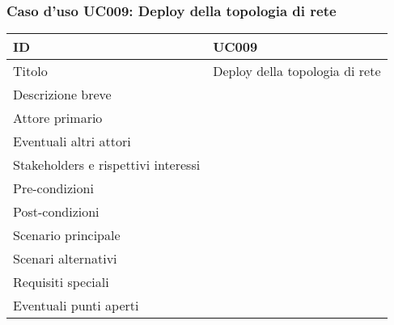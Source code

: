 \documentclass[../../main.tex]{subfiles}
\begin{document}
\subsubsection{Caso d’uso UC009: Deploy della topologia di rete }
\begin{tabularx}{150mm}{|l|X|}
    \hline
    ID                                  & \textbf{UC009}\\
    \hline
    Titolo                              & Deploy della topologia di rete \\
    \hline
    Descrizione breve                   &    \\
    \hline
    Attore primario                     &    \\
    \hline
    Eventuali altri attori              &    \\
    \hline
    Stakeholders e rispettivi interessi &    \\
    \hline
    Pre-condizioni                      &    \\
    \hline
    Post-condizioni                     &    \\
    \hline
    Scenario principale                 &    \\
    \hline
    Scenari alternativi                 &    \\
    \hline
    Requisiti speciali                  &    \\
    \hline
    Eventuali punti aperti              &    \\
    \hline
\end{tabularx}
\newpage
\end{document}
